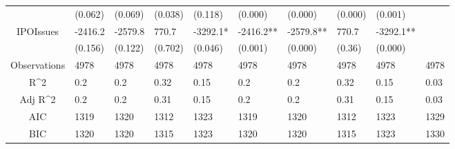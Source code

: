 \documentclass{article}
\begin{document}
\begin{table}[H]
\begin{tabular}{|clllllllll|}
   & (0.062) & (0.069) & (0.038) & (0.118) & (0.000) & (0.000) & (0.000) & (0.001) &  \\ 
  IPOIssues & -2416.2 & -2579.8 & 770.7 & -3292.1* & -2416.2** & -2579.8** & 770.7 & -3292.1** &  \\ 
   & (0.156) & (0.122) & (0.702) & (0.046) & (0.001) & (0.000) & (0.36) & (0.000) &  \\ 
  \hline 
 Observations & 4978 & 4978 & 4978 & 4978 & 4978 & 4978 & 4978 & 4978 & 4978 \\ 
  R^2 & 0.2 & 0.2 & 0.32 & 0.15 & 0.2 & 0.2 & 0.32 & 0.15 & 0.03 \\ 
  Adj R^2 & 0.2 & 0.2 & 0.31 & 0.15 & 0.2 & 0.2 & 0.31 & 0.15 & 0.03 \\ 
  AIC & 1319 & 1320 & 1312 & 1323 & 1319 & 1320 & 1312 & 1323 & 1329 \\ 
  BIC & 1320 & 1320 & 1315 & 1323 & 1320 & 1320 & 1315 & 1323 & 1330 \\ 
   \hline
\end{tabular}
 
\end{table}
\end{document}
